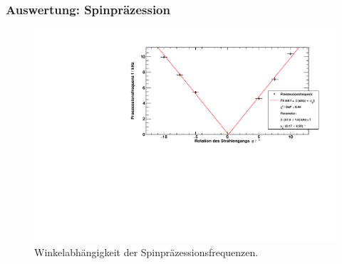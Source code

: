 \begin{frame}
\frametitle{Auswertung: Spinpräzession}

\begin{figure}
    \centering
    \includegraphics[width=\textwidth]{../img/winkel.pdf}
    \caption{Winkelabhängigkeit der Spinpräzessionsfrequenzen.}  
\end{figure} 
  
\end{frame}
